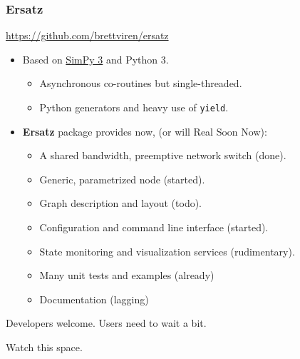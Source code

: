 \documentclass[xcolor=dvipsnames]{beamer}
\begin{document}
\begin{frame}
  \frametitle{Ersatz}

  \begin{center}
    \url{https://github.com/brettviren/ersatz}
  \end{center}

  \begin{itemize}
  \item Based on \href{https://simpy.readthedocs.io/}{SimPy 3} and Python 3.
    \begin{itemize}
    \item Asynchronous co-routines but single-threaded.
    \item Python generators and heavy use of \texttt{yield}.
    \end{itemize}
  \item \textbf{Ersatz} package provides now, (or will Real Soon Now):
    \begin{itemize}
    \item A shared bandwidth, preemptive network switch (done). 
    \item Generic, parametrized node (started).
    \item Graph description and layout (todo).
    \item Configuration and command line interface (started).
    \item State monitoring and visualization services (rudimentary).
    \item Many unit tests and examples (already)
    \item Documentation (lagging)
    \end{itemize}
  \end{itemize}
  Developers welcome.  Users need to wait a bit.

\end{frame}

\begin{frame}
  \begin{center}
    Watch this space.
  \end{center}
\end{frame}
\end{document}
